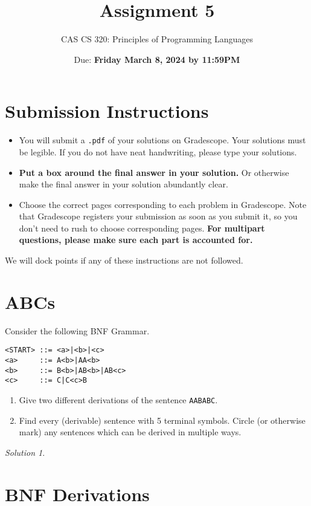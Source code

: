 \documentclass{article}
\title{
Assignment 5
}
\author{CAS CS 320: Principles of Programming Languages}
\date{Due: \textbf{Friday March 8, 2024 by 11:59PM}}
\theoremstyle{remark} \newtheorem*{solution}{Solution}
\begin{document}
\maketitle
\section*{Submission Instructions}
\begin{itemize}
\item
You will submit a \texttt{.pdf} of your solutions on Gradescope.  Your
solutions must be legible. If you do not have neat handwriting, please
type your solutions.
\item
\textbf{Put a box around the final answer in your solution.}  Or
otherwise make the final answer in your solution abundantly clear.
\item
Choose the correct pages corresponding to each problem in Gradescope.
Note that Gradescope registers your submission as soon as you submit
it, so you don’t need to rush to choose corresponding pages.
\textbf{For multipart questions, please make sure each part is
  accounted for.}
\end{itemize}
We will dock points if any of these instructions are not followed.

\pagebreak
\section{ABCs}
Consider the following BNF Grammar.
\begin{lstlisting}
<START> ::= <a>|<b>|<c>
<a>     ::= A<b>|AA<b>
<b>     ::= B<b>|AB<b>|AB<c>
<c>     ::= C|C<c>B
\end{lstlisting}

\begin{enumerate}
\item
Give two different derivations of the sentence \texttt{AABABC}.
\item
Find every (derivable) sentence with 5 terminal symbols.  Circle (or
otherwise mark) any sentences which can be derived in multiple ways.
\end{enumerate}

\begin{solution}
\end{solution}

\pagebreak
\section{BNF Derivations}
\end{document}
